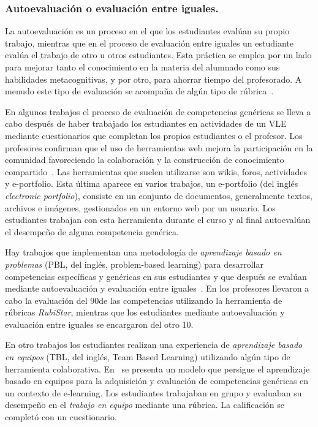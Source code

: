 \subsubsection{Autoevaluación o evaluación entre iguales.}

La autoevaluación es un proceso en el que los estudiantes evalúan su propio trabajo, mientras que  en el proceso de evaluación entre iguales un estudiante evalúa el trabajo de otro u otros estudiantes. Esta práctica se emplea por un lado para mejorar tanto el conocimiento en la materia del alumnado como sus habilidades metacognitivas, y por otro, para ahorrar tiempo del profesorado. A menudo este tipo de evaluación se acompaña de algún tipo de rúbrica~\cite{malehorn1994ten}.

En algunos trabajos el proceso de evaluación de competencias genéricas se lleva a cabo después de haber trabajado los estudiantes en actividades de un VLE mediante cuestionarios que completan los propios estudiantes o el profesor. Los profesores confirman que el uso de herramientas web mejora la participación en la comunidad favoreciendo la colaboración y la construcción de conocimiento compartido~\cite{starcic2008sustaining}. Las herramientas que suelen utilizarse son wikis, foros, actividades y e-portfolio. Esta última aparece en varios trabajos, un e-portfolio (del inglés \emph{electronic portfolio}), consiste en un conjunto de documentos, generalmente textos, archivos e imágenes, gestionados en un entorno web por un usuario. Los estudiantes trabajan con esta herramienta durante el curso y al final autoevalúan el desempeño de alguna competencia genérica\cite{arno2011promoting}.

Hay trabajos que implementan una metodología de \emph{aprendizaje basado en problemas} (PBL, del inglés, problem-based learning) para desarrollar competencias específicas y genéricas en sus estudiantes y que después se evalúan mediante autoevaluación y evaluación entre iguales~\cite{martinez2014teamwork}. En \cite{lasa2013problem} los profesores llevaron a cabo la evaluación del 90\percentage de las competencias utilizando la herramienta de rúbricas \emph{RubiStar}, mientras que los estudiantes mediante autoevaluación y evaluación entre iguales se encargaron del otro 10\percentage. 

En otro trabajos los estudiantes realizan una experiencia de \emph{aprendizaje basado en equipos} (TBL, del inglés, Team Based Learning) utilizando algún tipo de herramienta colaborativa. En~\cite{ficapal2015learning} se presenta un modelo que persigue el aprendizaje basado en equipos para la adquisición y evaluación de competencias genéricas en un contexto de e-learning. Los estudiantes trabajaban en grupo y evaluaban su desempeño en el \emph{trabajo en equipo} mediante una rúbrica. La calificación se completó con un cuestionario.

